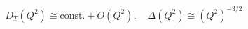 \begin{equation}
 D_T(Q^2) \cong \text{const.}   + O(Q^2), \quad \Delta(Q^2) \cong (Q^2)^{-3/2} 
\label{IRsol}
\end{equation}


